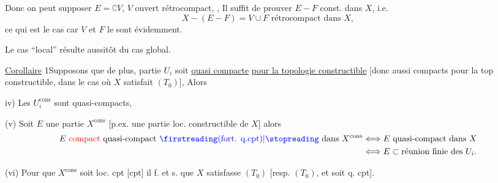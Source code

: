 Donc on peut supposer $E=\complement V$, $V$  ouvert rétrocompact,
, Il suffit de prouver  $E-F$ const. dans $X$, i.e.
\[
X-(E-F)=V\cup F\text{ rétrocompact dans }X,
\]
ce qui est le cas car $V$ et $F$ le sont évidemment.


Le cas ``local'' résulte aussitôt du cas global.

\uline{Corollaire} 1\quad Supposons que de plus, \unsure{$\forall$} partie $U_i$ soit \uline{quasi compacte}  \uline{pour la topologie constructible} [donc aussi  compacts pour la top constructible, dans le cas où  $X$ satisfait $(T_0)$],  Alors

iv) Les $U_i^{\mathrm{cons}}$ sont quasi-compacts, 

(v) Soit $E$ une partie  $X^{\mathrm{cons}}$ [p.ex. une partie loc. constructible de $X$] alors
\[
\begin{aligned}
E\ \deleted{\text{compact}}\ \text{quasi-compact}\ \inserted{\unsure{\text{(fort. q.cpt)}}}\ \text{dans }X^{\mathrm{cons}}
&\Longleftrightarrow E\text{ quasi-compact dans }X\\
&\Longleftrightarrow E\subset\text{réunion finie des }U_i.
\end{aligned}
\]

(vi) Pour que $X^{\mathrm{cons}}$ soit loc. cpt [cpt] il f. et s. que $X$ satisfasse $(T_0)$ [resp. $(T_0)$, et soit q. cpt].


